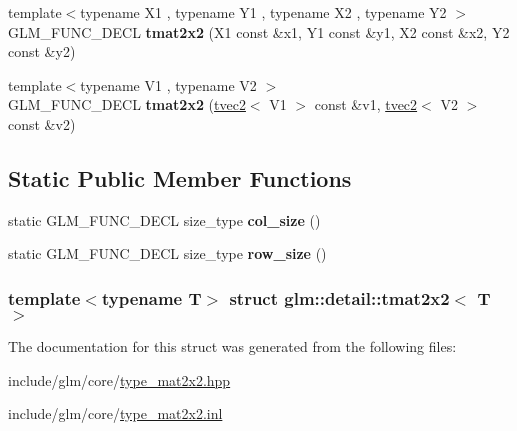 \begin{DoxyCompactItemize}
\item 
\hypertarget{structglm_1_1detail_1_1tmat2x2_a156ed12a043a58be23c0ca52a96f3ad6}{{\footnotesize template$<$typename X1 , typename Y1 , typename X2 , typename Y2 $>$ }\\\-G\-L\-M\-\_\-\-F\-U\-N\-C\-\_\-\-D\-E\-C\-L {\bfseries tmat2x2} (\-X1 const \&x1, \-Y1 const \&y1, \-X2 const \&x2, \-Y2 const \&y2)}\label{structglm_1_1detail_1_1tmat2x2_a156ed12a043a58be23c0ca52a96f3ad6}

\item 
\hypertarget{structglm_1_1detail_1_1tmat2x2_a5917090f191c8bd7ecbe81e369819e8a}{{\footnotesize template$<$typename V1 , typename V2 $>$ }\\\-G\-L\-M\-\_\-\-F\-U\-N\-C\-\_\-\-D\-E\-C\-L {\bfseries tmat2x2} (\hyperlink{structglm_1_1detail_1_1tvec2}{tvec2}$<$ \-V1 $>$ const \&v1, \hyperlink{structglm_1_1detail_1_1tvec2}{tvec2}$<$ \-V2 $>$ const \&v2)}\label{structglm_1_1detail_1_1tmat2x2_a5917090f191c8bd7ecbe81e369819e8a}

\end{DoxyCompactItemize}
\subsection*{\-Static \-Public \-Member \-Functions}
\begin{DoxyCompactItemize}
\item 
\hypertarget{structglm_1_1detail_1_1tmat2x2_a5c1a631a45f3ea10859433efd7d2c33a}{static \-G\-L\-M\-\_\-\-F\-U\-N\-C\-\_\-\-D\-E\-C\-L size\-\_\-type {\bfseries col\-\_\-size} ()}\label{structglm_1_1detail_1_1tmat2x2_a5c1a631a45f3ea10859433efd7d2c33a}

\item 
\hypertarget{structglm_1_1detail_1_1tmat2x2_a7b779a0e12e4e42a4372b03562ce7df9}{static \-G\-L\-M\-\_\-\-F\-U\-N\-C\-\_\-\-D\-E\-C\-L size\-\_\-type {\bfseries row\-\_\-size} ()}\label{structglm_1_1detail_1_1tmat2x2_a7b779a0e12e4e42a4372b03562ce7df9}

\end{DoxyCompactItemize}
\subsubsection*{template$<$typename \-T$>$ struct glm\-::detail\-::tmat2x2$<$ T $>$}



\-The documentation for this struct was generated from the following files\-:\begin{DoxyCompactItemize}
\item 
include/glm/core/\hyperlink{type__mat2x2_8hpp}{type\-\_\-mat2x2.\-hpp}\item 
include/glm/core/\hyperlink{type__mat2x2_8inl}{type\-\_\-mat2x2.\-inl}\end{DoxyCompactItemize}
